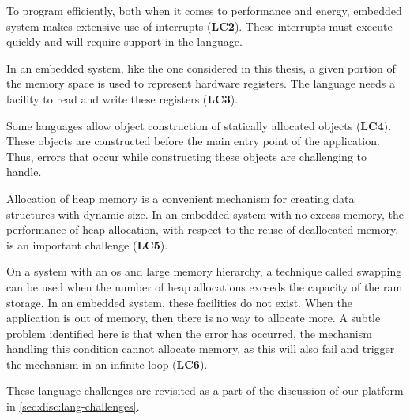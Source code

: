 To program efficiently, both when it comes to performance and energy, embedded system makes extensive use of interrupts (\textbf{LC2}).
These interrupts must execute quickly and will require support in the language.

In an embedded system, like the one considered in this thesis, a given portion of the memory space is used to represent hardware registers.
The language needs a facility to read and write these registers (\textbf{LC3}).

Some languages allow object construction of statically allocated objects (\textbf{LC4}).
These objects are constructed before the main entry point of the application.
Thus, errors that occur while constructing these objects are challenging to handle.

Allocation of heap memory is a convenient mechanism for creating data structures with dynamic size.
In an embedded system with no excess memory, the performance of heap allocation, with respect to the reuse of deallocated memory, is an important challenge (\textbf{LC5}).

On a system with an \gls{os} and large memory hierarchy, a technique called swapping can be used when the number of heap allocations exceeds the capacity of the \gls{ram} storage.
In an embedded system, these facilities do not exist.
When the application is out of memory, then there is no way to allocate more.
A subtle problem identified here is that when the error has occurred, the mechanism handling this condition cannot allocate memory, as this will also fail and trigger the mechanism in an infinite loop (\textbf{LC6}).

These language challenges are revisited as a part of the discussion of our platform in \autoref{sec:disc:lang-challenges}.
